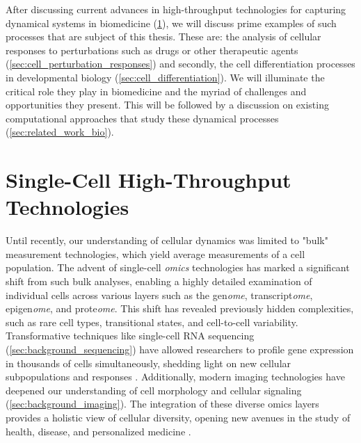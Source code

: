 After discussing current advances in high-throughput technologies for capturing dynamical systems in biomedicine (\cref{sec:tech_background}), we will discuss prime examples of such processes that are subject of this thesis. 
These are: the analysis of cellular responses to perturbations such as drugs or other therapeutic agents (\cref{sec:cell_perturbation_responses}) and secondly, the cell differentiation processes in developmental biology (\cref{sec:cell_differentiation}). We will illuminate the critical role they play in biomedicine and the myriad of challenges and opportunities they present. 
This will be followed by a discussion on existing computational approaches that study these dynamical processes (\cref{sec:related_work_bio}).


\section{Single-Cell High-Throughput Technologies}
\label{sec:tech_background}

Until recently, our understanding of cellular dynamics was limited to "bulk" measurement technologies, which yield average measurements of a cell population.
The advent of single-cell \textit{omics} technologies has marked a significant shift from such bulk analyses, enabling a highly detailed examination of individual cells across various layers such as the gen\textit{ome}, transcript\textit{ome}, epigen\textit{ome}, and prote\textit{ome}.
This shift has revealed previously hidden complexities, such as rare cell types, transitional states, and cell-to-cell variability. Transformative techniques like single-cell RNA sequencing (\cref{sec:background_sequencing}) have allowed researchers to profile gene expression in thousands of cells simultaneously, shedding light on new cellular subpopulations and responses \citep{jia2022high}.
Additionally, modern imaging technologies have deepened our understanding of cell morphology and cellular signaling (\cref{sec:background_imaging}). 
The integration of these diverse omics layers provides a holistic view of cellular diversity, opening new avenues in the study of health, disease, and personalized medicine \citep{baysoy2023technological}.


